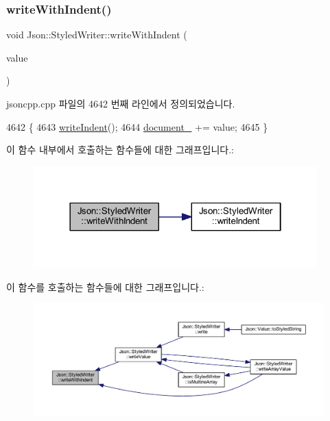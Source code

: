 \mbox{\label{class_json_1_1_styled_writer_ac38e02972054125c38efbe327b52f6ac}} 
\subsubsection{\texorpdfstring{write\+With\+Indent()}{writeWithIndent()}}
{\footnotesize\ttfamily void Json\+::\+Styled\+Writer\+::write\+With\+Indent (\begin{DoxyParamCaption}\item[{const \hyperlink{json_8h_a1e723f95759de062585bc4a8fd3fa4be}{J\+S\+O\+N\+C\+P\+P\+\_\+\+S\+T\+R\+I\+NG} \&}]{value }\end{DoxyParamCaption})\hspace{0.3cm}{\ttfamily [private]}}



jsoncpp.\+cpp 파일의 4642 번째 라인에서 정의되었습니다.


\begin{DoxyCode}
4642                                                               \{
4643   \hyperlink{class_json_1_1_styled_writer_a885f4bfb5701896d60eee6716d2db7e4}{writeIndent}();
4644   \hyperlink{class_json_1_1_styled_writer_ae967b0c77e4d7cb889ce7b6ee4ce28d7}{document\_} += value;
4645 \}
\end{DoxyCode}
이 함수 내부에서 호출하는 함수들에 대한 그래프입니다.\+:\nopagebreak
\begin{figure}[H]
\begin{center}
\leavevmode
\includegraphics[width=310pt]{class_json_1_1_styled_writer_ac38e02972054125c38efbe327b52f6ac_cgraph}
\end{center}
\end{figure}
이 함수를 호출하는 함수들에 대한 그래프입니다.\+:\nopagebreak
\begin{figure}[H]
\begin{center}
\leavevmode
\includegraphics[width=350pt]{class_json_1_1_styled_writer_ac38e02972054125c38efbe327b52f6ac_icgraph}
\end{center}
\end{figure}


